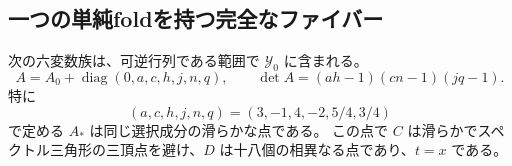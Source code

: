 \subsection{一つの単純foldを持つ完全なファイバー}

\begin{lemma}[同じ成分上の厳密な特殊化]
\label{lem:septic-witness-v29}
次の六変数族は、可逆行列である範囲で $\mathcal Y_0$ に含まれる。
\[
 A=A_0+\operatorname{diag}(0,a,c,h,j,n,q),
 \qquad
 \det A=(ah-1)(cn-1)(jq-1).
\]
特に
\begin{equation}\label{eq:septic-Astar-v29}
 (a,c,h,j,n,q)=(3,-1,4,-2,5/4,3/4)
\end{equation}
で定める $A_*$ は同じ選択成分の滑らかな点である。
この点で $C$ は滑らかでスペクトル三角形の三頂点を避け、$D$ は十八個の相異なる点であり、$t=x$ である。
\end{lemma}

